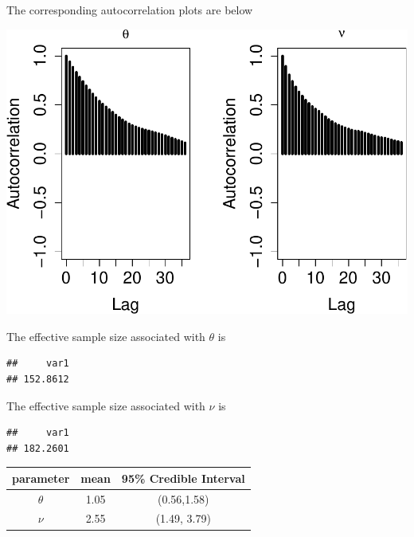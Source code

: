 \documentclass[]{article}
\begin{document}
The corresponding autocorrelation plots are below

\includegraphics{AMS206b_H4_files/figure-latex/unnamed-chunk-28-1.pdf}

The effective sample size associated with \(\theta\) is

\begin{verbatim}
##     var1 
## 152.8612
\end{verbatim}

The effective sample size associated with \(\nu\) is

\begin{verbatim}
##     var1 
## 182.2601
\end{verbatim}

\begin{center}
\begin{tabular}{ |c|c|c| }
\hline
 parameter & mean & 95\% Credible Interval \\ 
 \hline
 $\theta$ & 1.05 & (0.56,1.58) \\  
 $\nu$ & 2.55 & (1.49, 3.79)\\
 \hline
\end{tabular}
\end{center}
\end{document}
